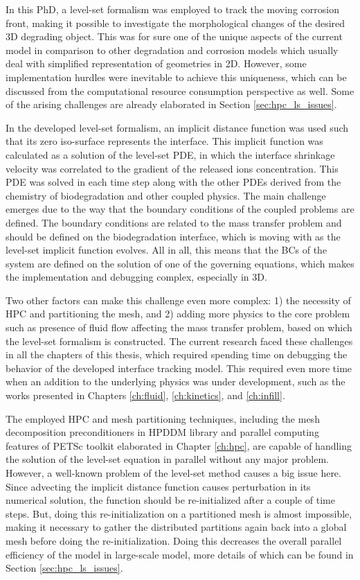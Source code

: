 In this PhD, a level-set formalism was employed to track the moving corrosion front, making it possible to investigate the morphological changes of the desired 3D degrading object. This was for sure one of the unique aspects of the current model in comparison to other degradation and corrosion models which usually deal with simplified representation of geometries in 2D. However, some implementation hurdles were inevitable to achieve this uniqueness, which can be discussed from the computational resource consumption perspective as well. Some of the arising challenges are already elaborated in Section \ref{sec:hpc_ls_issues}.

In the developed level-set formalism, an implicit distance function was used such that its zero iso-surface represents the interface. This implicit function was calculated as a solution of the level-set PDE, in which the interface shrinkage velocity was correlated to the gradient of the released ions concentration. This PDE was solved in each time step along with the other PDEs derived from the chemistry of biodegradation and other coupled physics. The main challenge emerges due to the way that the boundary conditions of the coupled problems are defined. The boundary conditions are related to the mass transfer problem and should be defined on the biodegradation interface, which is moving with as the level-set implicit function evolves. All in all, this means that the BCs of the system are defined on the solution of one of the governing equations, which makes the implementation and debugging complex, especially in 3D. 

Two other factors can make this challenge even more complex: 1) the necessity of HPC and partitioning the mesh, and 2) adding more physics to the core problem such as presence of fluid flow affecting the mass transfer problem, based on which the level-set formalism is constructed. The current research faced these challenges in all the chapters of this thesis, which required spending time on debugging the behavior of the developed interface tracking model. This required even more time when an addition to the underlying physics was under development, such as the works presented in Chapters \ref{ch:fluid}, \ref{ch:kinetics}, and \ref{ch:infill}.

The employed HPC and mesh partitioning techniques, including the mesh decomposition preconditioners in HPDDM library and parallel computing features of PETSc toolkit elaborated in Chapter \ref{ch:hpc}, are capable of handling the solution of the level-set equation in parallel without any major problem. However, a well-known problem of the level-set method causes a big issue here. Since advecting the implicit distance function causes perturbation in its numerical solution, the function should be re-initialized after a couple of time steps. But, doing this re-initialization on a partitioned mesh is almost impossible, making it necessary to gather the distributed partitions again back into a global mesh before doing the re-initialization. Doing this decreases the overall parallel efficiency of the model in large-scale model, more details of which can be found  in Section \ref{sec:hpc_ls_issues}.

